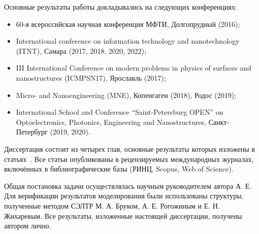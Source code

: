 Основные результаты работы докладывались на следующих конференциях:
\begin{itemize}
	\item 60-я всероссийская научная конференция МФТИ, Долгопрудный (2016);
	\item International conference on information technology and nanotechnology (ITNT), Самара (2017, 2018, 2020, 2022);
	\item III International Conference on modern problems in physics of surfaces and nanostructures (ICMPSN17), Ярославль (2017);
	\item Micro- and Nanoengineering (MNE), Копенгаген (2018), Родос (2019);
	\item International School and Conference ``Saint-Petersburg OPEN'' on Optoelectronics, Photonics, Engineering and Nanostructures, Санкт-Петербург (2019, 2020).	
\end{itemize}

Диссертация состоит из четырех глав, основные результаты которых изложены в статьях~\cite{my_CO, my_microlenses, my_evidence, my_detailed, my_review_RU, my_MEE, my_Gvalue, my_microscopic, my_Isaev_RU}. Все статьи опубликованы в рецензируемых международных журналах, включённых в библиографические базы (РИНЦ, Scopus, Web of Science).


\contribution

Общая постановка задачи осуществлялась научным руководителем автора  А. Е. Для верификации результатов моделирования были использованы структуры, полученные методом СЭЛТР М. А. Бруком, А. Е. Рогожиным и Е. Н. Жихаревым. Все результаты, изложенные настоящей диссертации, получены автором лично.
